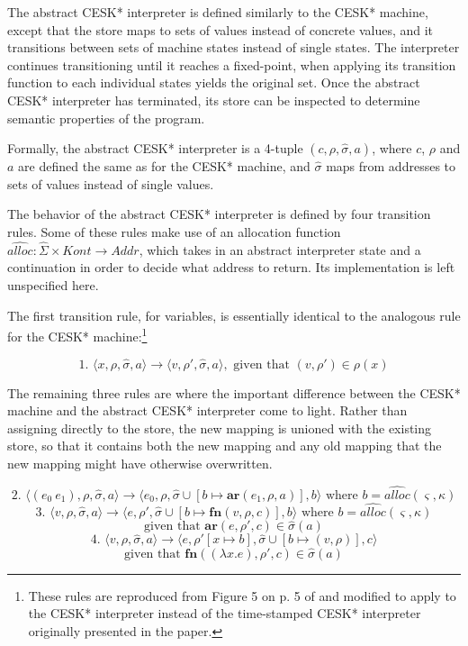 \documentclass{article}
\begin{document}
The abstract CESK* interpreter is defined similarly to the CESK* machine, except that the store maps to sets of values instead of concrete values, and it transitions between sets of machine states instead of single states. The interpreter continues transitioning until it reaches a fixed-point, when applying its transition function to each individual states yields the original set. Once the abstract CESK* interpreter has terminated, its store can be inspected to determine semantic properties of the program.

Formally, the abstract CESK* interpreter is a 4-tuple $(c, \rho, \hat{\sigma}, a)$, where $c$, $\rho$ and $a$ are defined the same as for the CESK* machine, and $\hat{\sigma}$ maps from addresses to sets of values instead of single values.

The behavior of the abstract CESK* interpreter is defined by four transition rules. Some of these rules make use of an allocation function $\widehat{alloc} : \hat{\Sigma} \times Kont \to Addr$, which takes in an abstract interpreter state and a continuation in order to decide what address to return. Its implementation is left unspecified here.

The first transition rule, for variables, is essentially identical to the analogous rule for the CESK* machine:\footnote{These rules are reproduced from Figure 5 on p. 5 of \cite{aam} and modified to apply to the CESK* interpreter instead of the time-stamped CESK* interpreter originally presented in the paper.}

$$
\text{1. }
\langle x, \rho, \hat{\sigma}, a \rangle
\to
\langle v, \rho', \hat{\sigma}, a \rangle,
\text{ given that $(v, \rho') \in \rho(x)$}
$$

The remaining three rules are where the important difference between the CESK* machine and the abstract CESK* interpreter come to light. Rather than assigning directly to the store, the new mapping is unioned with the existing store, so that it contains both the new mapping and any old mapping that the new mapping might have otherwise overwritten.

$$
\text{2. }
\langle (e_0\ e_1), \rho, \hat{\sigma}, a \rangle
\to
\langle e_0, \rho, \hat{\sigma} \cup [b \mapsto \textbf{ar}(e_1, \rho, a)], b \rangle
\text{ where $b = \widehat{alloc}(\varsigma, \kappa)$}
$$
$$
\text{3. }
\langle v, \rho, \hat{\sigma}, a \rangle
\to
\langle e, \rho', \hat{\sigma} \cup [b \mapsto \textbf{fn}(v, \rho, c)], b \rangle
\text{ where $b = \widehat{alloc}(\varsigma, \kappa)$}
$$
$$
\text{given that } \textbf{ar}(e, \rho', c) \in \hat{\sigma}(a)
$$
$$
\text{4. }
\langle v, \rho, \hat{\sigma}, a \rangle
\to
\langle e, \rho'[x \mapsto b], \hat{\sigma} \cup [b \mapsto (v, \rho)], c \rangle
$$
$$
\text{given that } \textbf{fn}((\lambda x.e), \rho', c) \in \hat{\sigma}(a)
$$
\end{document}
